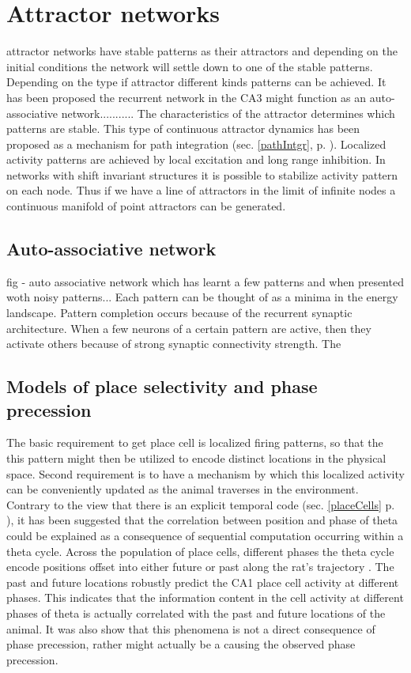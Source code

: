 \section{Attractor networks}
attractor networks have stable patterns as their attractors and depending on the initial conditions the network will settle down to one of the stable patterns. Depending on the type if attractor different kinds patterns can be achieved. It has been proposed the recurrent network in the CA3 might function as an auto-associative network........... The characteristics of the attractor determines which patterns are stable.
This type of continuous attractor dynamics has been proposed as a mechanism for path integration (sec. \ref{pathIntgr}, p. \pageref{pathIntgr}). Localized activity patterns are achieved by local excitation and long range inhibition. In networks  with shift invariant structures it is possible to stabilize activity pattern on each node. Thus if we have a line of attractors in the limit of infinite nodes a continuous manifold of point attractors can be generated.

\subsection{Auto-associative network}
fig - auto associative network which has learnt a few patterns and when presented woth noisy patterns... Each pattern can be thought of as a minima in the energy landscape. Pattern completion occurs because of the recurrent synaptic architecture. When a few neurons of a certain pattern are active, then they activate others because of strong synaptic connectivity strength. The 


\subsection{Models of place selectivity and phase precession}
The basic requirement to get place cell is localized firing patterns, so that the this pattern might then be utilized to encode distinct locations in the physical space. Second requirement is to have a mechanism by which this localized activity can be conveniently updated as the animal traverses in the environment.\\

Contrary to the view that there is an explicit temporal code (sec. \ref{placeCells} p. \pageref{placeCells}), it has been suggested that the correlation between position and phase of theta could be explained as a consequence of sequential computation occurring within a theta cycle. Across the population of place cells, different phases the theta cycle encode positions offset into either future or past along the rat's trajectory \cite{Itskov2008}. The past and future locations  robustly predict the CA1 place cell activity at different phases. This indicates that the information content in the cell activity at different phases of theta is actually correlated with the past and future locations of the animal. It was also show that this phenomena is not a direct consequence of phase precession, rather might actually be a causing the observed phase precession. \\

